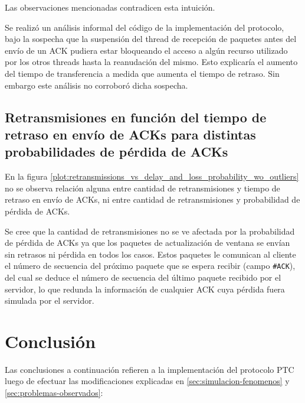 \documentclass[a4paper, 10pt, twoside]{article}
\newcommand{\ack}{\texttt{\#ACK}\xspace}
\begin{document}
Las observaciones mencionadas contradicen esta intuición.

Se realizó un análisis informal del código de la implementación del protocolo, bajo la sospecha que la suspensión del thread de recepción de paquetes antes del envío de un ACK pudiera estar bloqueando el acceso a algún recurso utilizado por los otros threads hasta la reanudación del mismo. Esto explicaría el aumento del tiempo de transferencia a medida que aumenta el tiempo de retraso. Sin embargo este análisis no corroboró dicha sospecha.


\subsection{Retransmisiones en función del tiempo de retraso en envío de ACKs para distintas probabilidades de pérdida de ACKs}
\label{sec:retr_vs_delay_and_loss}

En la figura \ref{plot:retransmissions_vs_delay_and_loss_probability_wo_outliers} no se observa relación alguna entre cantidad de retransmisiones y tiempo de retraso en envío de ACKs, ni entre cantidad de retransmisiones y probabilidad de pérdida de ACKs.

Se cree que la cantidad de retransmisiones no se ve afectada por la probabilidad de pérdida de ACKs ya que los paquetes de actualización de ventana se envían sin retrasos ni pérdida en todos los casos. Estos paquetes le comunican al cliente el número de secuencia del próximo paquete que se espera recibir (campo \ack), del cual se deduce el número de secuencia del último paquete recibido por el servidor, lo que redunda la información de cualquier ACK cuya pérdida fuera simulada por el servidor.




\section{Conclusión}

Las conclusiones a continuación refieren a la implementación del protocolo PTC luego de efectuar las modificaciones explicadas en \ref{sec:simulacion-fenomenos} y \ref{sec:problemas-observados}:
\end{document}
